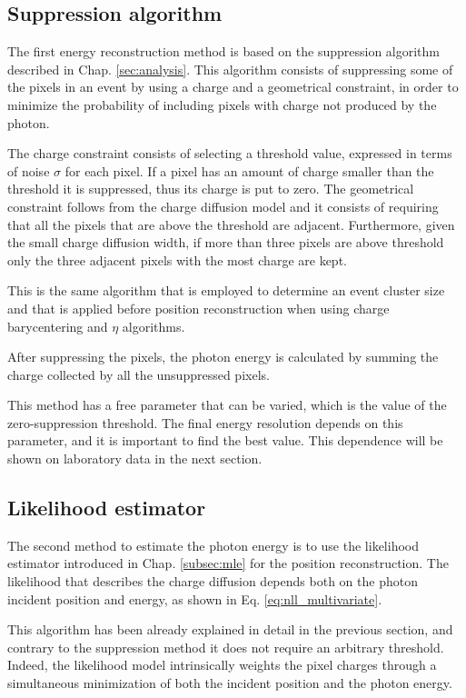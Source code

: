 \subsection{Suppression algorithm}
The first energy reconstruction method is based on the suppression algorithm described in Chap. \ref{sec:analysis}. This algorithm consists of suppressing some of the pixels in an event by using a charge and a geometrical constraint, in order to minimize the probability of including pixels with charge not produced by the photon.

The charge constraint consists of selecting a threshold value, expressed in terms of noise $\sigma$ for each pixel. If a pixel has an amount of charge smaller than the threshold it is suppressed, thus its charge is put to zero. The geometrical constraint follows from the charge diffusion model and it consists of requiring that all the pixels that are above the threshold are adjacent. Furthermore, given the small charge diffusion width, if more than three pixels are above threshold only the three adjacent pixels with the most charge are kept.

This is the same algorithm that is employed to determine an event cluster size and that is applied before position reconstruction when using charge barycentering and $\eta$ algorithms.

After suppressing the pixels, the photon energy is calculated by summing the charge collected by all the unsuppressed pixels.

This method has a free parameter that can be varied, which is the value of the zero-suppression threshold. The final energy resolution depends on this parameter, and it is important to find the best value. This dependence will be shown on laboratory data in the next section.

\subsection{Likelihood estimator}
The second method to estimate the photon energy is to use the likelihood estimator introduced in Chap. \ref{subsec:mle} for the position reconstruction. The likelihood that describes the charge diffusion depends both on the photon incident position and energy, as shown in  Eq. \ref{eq:nll_multivariate}.

This algorithm has been already explained in detail in the previous section, and contrary to the suppression method it does not require an arbitrary threshold. Indeed, the likelihood model intrinsically weights the pixel charges through a simultaneous minimization of both the incident position and the photon energy.

